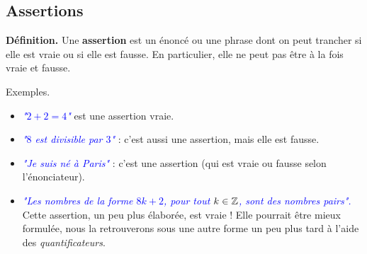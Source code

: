 \documentclass[11pt,class=report,crop=false]{standalone}
\begin{document}
\newcommand{\Assertion}[1]{\textcolor{blue}{\emph{#1}}}








\bigskip

\subsection*{Assertions}

\textbf{Définition.} Une \textbf{assertion} est un énoncé ou une phrase dont on peut trancher si elle est vraie ou si elle est fausse. En particulier, elle ne peut pas être à la fois vraie et fausse.

Exemples.
\begin{itemize}
    \item \Assertion{"$2+2=4$"} est une assertion vraie.
    \item \Assertion{"$8$ est divisible par $3$"} : c'est aussi une assertion, mais elle est fausse.
    \item \Assertion{"Je suis né à Paris"} : c'est une assertion (qui est vraie ou fausse selon l'énonciateur).
    \item \Assertion{"Les nombres de la forme $8k + 2$, pour tout $k \in \mathbb{Z}$, sont des nombres pairs".} Cette assertion, un peu plus élaborée, est vraie ! Elle pourrait être mieux formulée, nous la retrouverons sous une autre forme un peu plus tard à l'aide des \emph{quantificateurs}.
\end{itemize}
\end{document}
